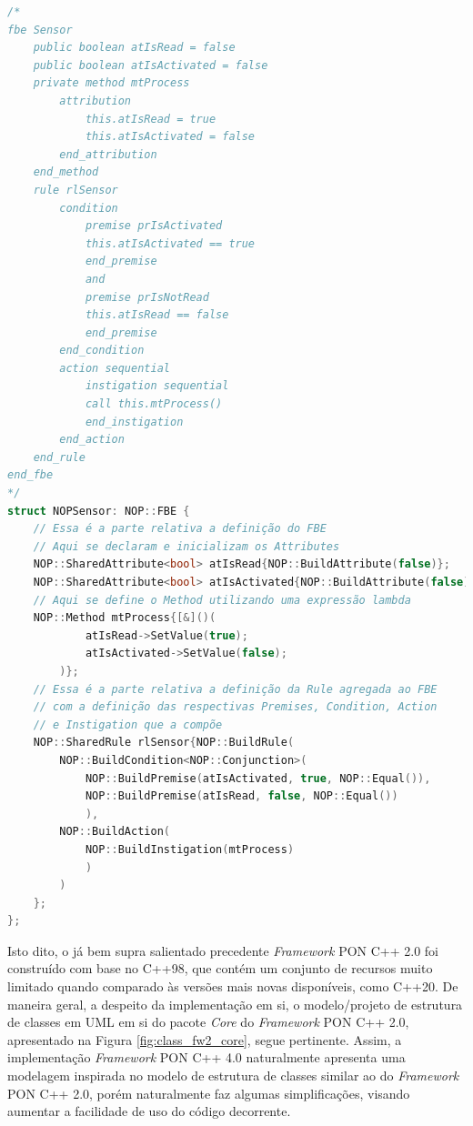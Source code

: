 \begin{lstlisting}[language=C++, float=htb,
    caption = {Implementação do \textit{FBE} \textit{Sensor} em \textit{Framework} PON C++ 4.0},
    source = {Autoria própria},
    label = {cod:fw4_sensor}]
/*
fbe Sensor
    public boolean atIsRead = false
    public boolean atIsActivated = false
    private method mtProcess
        attribution
            this.atIsRead = true
            this.atIsActivated = false
        end_attribution
    end_method
    rule rlSensor
        condition
            premise prIsActivated
            this.atIsActivated == true
            end_premise
            and
            premise prIsNotRead
            this.atIsRead == false
            end_premise
        end_condition
        action sequential
            instigation sequential
            call this.mtProcess()
            end_instigation
        end_action
    end_rule
end_fbe
*/
struct NOPSensor: NOP::FBE {
    // Essa é a parte relativa a definição do FBE
    // Aqui se declaram e inicializam os Attributes
    NOP::SharedAttribute<bool> atIsRead{NOP::BuildAttribute(false)};
    NOP::SharedAttribute<bool> atIsActivated{NOP::BuildAttribute(false)};
    // Aqui se define o Method utilizando uma expressão lambda
    NOP::Method mtProcess{[&]()(
            atIsRead->SetValue(true);
            atIsActivated->SetValue(false);
        )};
    // Essa é a parte relativa a definição da Rule agregada ao FBE
    // com a definição das respectivas Premises, Condition, Action
    // e Instigation que a compõe
    NOP::SharedRule rlSensor{NOP::BuildRule(
        NOP::BuildCondition<NOP::Conjunction>( 
            NOP::BuildPremise(atIsActivated, true, NOP::Equal()), 
            NOP::BuildPremise(atIsRead, false, NOP::Equal())
            ),
        NOP::BuildAction(
            NOP::BuildInstigation(mtProcess)
            )
        )
    };
};
\end{lstlisting}

Isto dito, o já bem supra salientado precedente \textit{Framework} PON C++ 2.0
foi construído com base no C++98, que contém um conjunto de recursos muito
limitado quando comparado às versões mais novas disponíveis, como C++20. De
maneira geral, a despeito da implementação em si, o modelo/projeto de estrutura
de classes em UML em si do pacote \textit{Core} do \textit{Framework} PON C++
2.0, apresentado na Figura \ref{fig:class_fw2_core}, segue pertinente. Assim, a
implementação \textit{Framework} PON C++ 4.0 naturalmente apresenta uma
modelagem inspirada no modelo de estrutura de classes similar ao do
\textit{Framework} PON C++ 2.0, porém naturalmente faz algumas simplificações,
visando aumentar a facilidade de uso do código decorrente.

